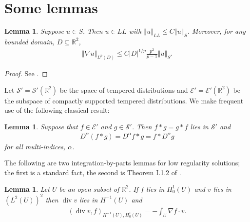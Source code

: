 \documentclass[reqno,openright,11pt,twoside]{amsart}
\newtheorem{lemma}[theorem]{Lemma}
\theoremstyle{definition}
\numberwithin{equation}{section}
\begin{document}
\appendix
\section{Some lemmas}\label{A:SomeLemmas}

\begin{lemma}\label{L:Morrey}
	Suppose $u \in S$. Then $u \in LL$ with ${\ensuremath{\left\Vert {u} \right\Vert}}_{LL} \le C {\ensuremath{\left\Vert {u} \right\Vert}}_S$.
	Moreover, for any bounded domain, $D \subseteq {\ensuremath{{\ensuremath{\mathbb{{R}}}}}}^2$,
	\begin{align*}
		{\ensuremath{\left\Vert {{\ensuremath{\nabla}} u} \right\Vert}}_{L^p(D)}
			\le C {\left\vert{D}\right\vert}^{1/p} \frac{p^2}{p - 1} {\ensuremath{\left\Vert {u} \right\Vert}}_S.
	\end{align*}
\end{lemma}
\begin{proof}
	See \cite{AKLL2014}.
\end{proof}

Let ${\ensuremath{\mathcal{{S}}}}' = {\ensuremath{\mathcal{{S}}}}'({\ensuremath{{\ensuremath{\mathbb{{R}}}}}}^2)$ be the space of tempered distributions and ${\ensuremath{\mathcal{{E}}}}' = {\ensuremath{\mathcal{{E}}}}'({\ensuremath{{\ensuremath{\mathbb{{R}}}}}}^2)$ be the subspace of compactly supported tempered distributions. We make frequent use of the following classical result:

\begin{lemma}\label{L:Conv}
	Suppose that $f \in {\ensuremath{\mathcal{{E}}}}'$ and $g \in {\ensuremath{\mathcal{{S}}}}'$. Then $f * g = g * f$ lies in ${\ensuremath{\mathcal{{S}}}}'$ and
	\begin{align*}
		D^{\ensuremath{\alpha}}(f * g) = D^{\ensuremath{\alpha}} f * g = f * D^{\ensuremath{\alpha}} g
	\end{align*}
	for all multi-indices, ${\ensuremath{\alpha}}$.
\end{lemma}

The following are two integration-by-parts lemmas for low regularity solutions; the first is a standard fact, the second is Theorem I.1.2 of \cite{T2001}.
\begin{lemma}\label{L:Hm1H01}
	Let $U$ be an open subset of ${\ensuremath{{\ensuremath{\mathbb{{R}}}}}}^2$.
	If $f$ lies in $H_0^1(U)$ and $v$ lies in $(L^2(U))^2$ then $\operatorname{div} v$ lies in $H^{-1}(U)$ and
	\begin{align*}
		(\operatorname{div} v, f)_{H^{-1}(U), H_0^1(U)}
			= - \int_U {\ensuremath{\nabla}} f \cdot v.
	\end{align*}
\end{lemma}
\end{document}
